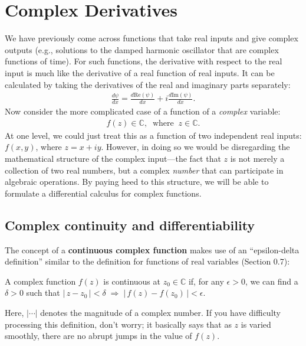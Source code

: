\documentclass[10pt,a4paper]{article}
\begin{document}
\setcounter{page}{45}

\section{Complex Derivatives}\label{complex-derivatives}

We have previously come across functions that take real inputs and
give complex outputs (e.g., solutions to the damped harmonic
oscillator that are complex functions of time).  For such functions,
the derivative with respect to the real input is much like the
derivative of a real function of real inputs.  It can be calculated by
taking the derivatives of the real and imaginary parts separately:
\begin{align}
  \frac{d\psi}{dx} = \frac{d\mathrm{Re}(\psi)}{dx} + i \frac{d\mathrm{Im}(\psi)}{dx}.
\end{align}
Now consider the more complicated case of a function of a
\textit{complex} variable:
\begin{align}
  f(z) \in \mathbb{C}, \;\;\mathrm{where}\;\; z \in \mathbb{C}.
\end{align}
At one level, we could just treat this as a function of two
independent real inputs: $f(x,y)$, where $z = x + i y$. However, in
doing so we would be disregarding the mathematical structure of the
complex input---the fact that $z$ is not merely a collection of two
real numbers, but a complex \textit{number} that can participate in
algebraic operations.  By paying heed to this structure, we will be
able to formulate a differential calculus for complex functions.

\subsection{Complex continuity and differentiability}
\label{complex-continuity-and-differentiability}

The concept of a \textbf{continuous complex function} makes use of an
``epsilon-delta definition'' similar to the definition for functions
of real variables (Section 0.7):

\begin{framed}
  \noindent
  A complex function $f(z)$ is continuous at $z_0 \in \mathbb{C}$ if, for any $\epsilon > 0$, we can find a $\delta > 0$ such that $\big|\, z - z_0 \,\big| < \delta \; \Rightarrow \; \big|\, f(z) - f(z_0) \,\big| < \epsilon$.
\end{framed}

\noindent
Here, $|\cdots|$ denotes the magnitude of a complex number.  If you
have difficulty processing this definition, don't worry; it basically
says that as $z$ is varied smoothly, there are no abrupt jumps in the
value of $f(z)$.
\end{document}
